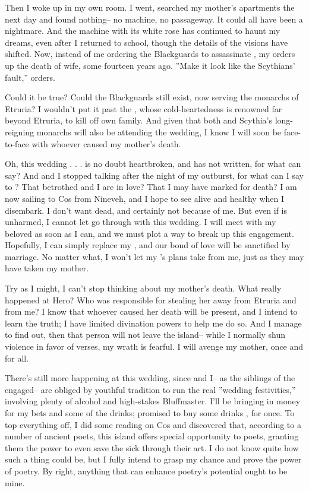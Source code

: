 \documentclass[char]{Kos}
\begin{document}
Then I woke up in my own room. I went, searched my mother's apartments the next day and found nothing-- no machine, no passageway. It could all have been a nightmare. And the machine with its white rose has continued to haunt my dreams, even after I returned to school, though the details of the visions have shifted. Now, instead of me ordering the Blackguards to assassinate \cGroom{}, my \cEtruriaKing{\parent} orders up the death of \cEtruriaKing{\their} wife, some fourteen years ago. ''Make it look like the Scythians' fault,'' \cEtruriaKing{\they} orders.

Could it be true? Could the Blackguards still exist, now serving the monarchs of Etruria? I wouldn't put it past the \cEtruriaKing{\monarch}, whose cold-heartedness is renowned far beyond Etruria, to kill off \cEtruriaKing{\their} own family. And given that both \cEtruriaKing{\they} and Scythia's long-reigning monarchs will also be attending the wedding, I know I will soon be face-to-face with whoever caused my mother's death.

Oh, this wedding . . . \cBride{} is no doubt heartbroken, and \cBride{\they} has not written, for what can \cBride{} say? And \cGroom{} and I stopped talking after the night of my outburst, for what can I say to \cGroom{\them}? That \cGroom{\their} betrothed and I are in love? That I may have marked \cGroom{\them} for death? I am now sailing to Cos from Nineveh, and I hope to see \cGroom{\them} alive and healthy when I disembark. I don't want \cGroom{\them} dead, and certainly not because of me. But even if \cGroom{\they} is unharmed, I cannot let \cGroom{\them} go through with this wedding. I will meet with my beloved as soon as I can, and we must plot a way to break up this engagement. Hopefully, I can simply replace my \cGroom{\sibling}, and our bond of love will be sanctified by marriage. No matter what, I won't let my \cEtruriaKing{\parent}'s plans take \cBride{} from me, just as they may have taken my mother. 

Try as I might, I can't stop thinking about my mother's death. What really happened at Hero? Who was responsible for stealing her away from Etruria and from me? I know that whoever caused her death will be present, and I intend to learn the truth; I have limited divination powers to help me do so. And I manage to find out, then that person will not leave the island-- while I normally shun violence in favor of verses, my wrath is fearful. I will avenge my mother, once and for all.

There's still more happening at this wedding, since \cWard{} and I-- as the siblings of the engaged-- are obliged by youthful tradition to run the real ''wedding festivities,'' involving plenty of alcohol and high-stakes Bluffmaster. I'll be bringing in money for my bets and some of the drinks; \cWard{} promised to buy some drinks \cWard{\themself}, for once. To top everything off, I did some reading on Cos and discovered that, according to a number of ancient poets, this island offers special opportunity to poets, granting them the power to even save the sick through their art. I do not know quite how such a thing could be, but I fully intend to grasp my chance and prove the power of poetry. By right, anything that can enhance poetry's potential ought to be mine.
\end{document}
